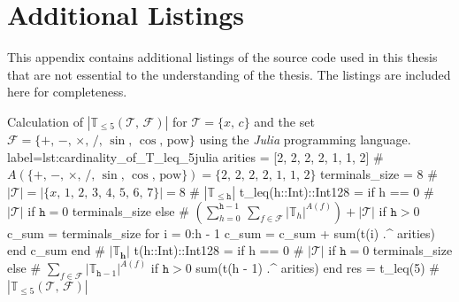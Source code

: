 \chapter{Additional Listings}
\label{app:Listings}
  This appendix contains additional listings of the source code used in this
  thesis that are not essential to the understanding of the thesis.
  The listings are included here for completeness.
  
  \begin{code}{
    Calculation of \(|\mathbb{T}_{\leq 5}(\mathcal{T},\, \mathcal{F})|\) for 
    \(\mathcal{T} = \{x,\, c\}\) and the set \(\mathcal{F} = \{+,\, -,\, 
    \times,\, /,\, \sin,\, \cos,\, \mathrm{pow}\}\) using the \textit{Julia}
    programming language.
  }{label={lst:cardinality_of_T_leq_5}}{julia}
    arities = [2, 2, 2, 2, 1, 1, 2] # $A\left(\{+,\,-,\,\times,\,/,\,\sin,\,\cos,\,\mathrm{pow}\}\right) = \{2,\,2,\,2,\,2,\,1,\,1,\,2\}$
    terminals_size = 8  # $|\mathcal{T}| = |\{x,\,1,\,2,\,3,\,4,\,5,\,6,\,7\}| = 8$
    # $|\mathbb{T}_{\leq \mathtt{h}}|$
    t_leq(h::Int)::Int128 = if h == 0 # $|\mathcal{T}|$ if $\mathtt{h} = 0$
      terminals_size
    else  # $\left(\sum_{h = 0}^{\mathtt{h} - 1}\,\sum_{f \in \mathcal{F}} |\mathbb{T}_h|^{A(f)}\right)+ |\mathcal{T}|$ if $\mathtt{h} > 0$
      c_sum = terminals_size
      for i = 0:h - 1
        c_sum = c_sum + sum(t(i) .^ arities)
      end
      c_sum
    end
    # $|\mathbb{T}_\mathbf{h}|$
    t(h::Int)::Int128 = if h == 0 # $|\mathcal{T}|$ if $\mathtt{h} = 0$
      terminals_size
    else  # $\sum_{f \in \mathcal{F}} |\mathbb{T}_{\mathtt{h} - 1}|^{A(f)}$ if $\mathtt{h} > 0$
      sum(t(h - 1) .^ arities) 
    end
    res = t_leq(5)  # $|\mathbb{T}_{\leq 5}(\mathcal{T},\, \mathcal{F})|$
  \end{code}
  


